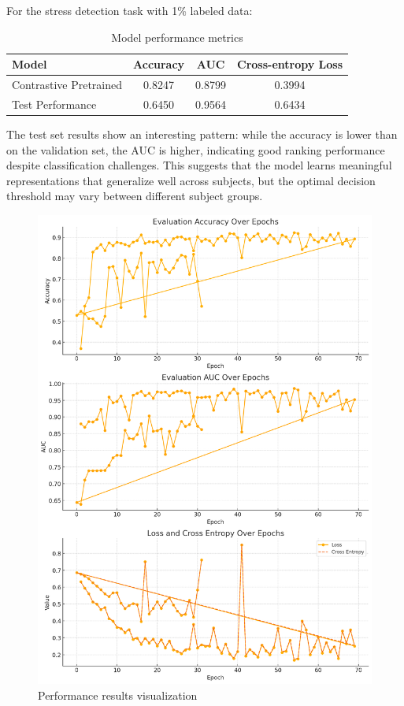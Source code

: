 \documentclass[10pt,letterpaper,twocolumn]{article}
\begin{document}
For the stress detection task with 1\% labeled data:

\begin{table}[ht]
\centering
\begin{tabular}{lccc}
\toprule
Model & Accuracy & AUC & Cross-entropy Loss \\
\midrule
Contrastive Pretrained & 0.8247 & 0.8799 & 0.3994 \\
Test Performance & 0.6450 & 0.9564 & 0.6434 \\
\bottomrule
\end{tabular}
\caption{Model performance metrics}
\label{tab:performance}
\end{table}

The test set results show an interesting pattern: while the accuracy is lower than on the validation set, the AUC is higher, indicating good ranking performance despite classification challenges. This suggests that the model learns meaningful representations that generalize well across subjects, but the optimal decision threshold may vary between different subject groups.

\begin{figure}[ht]
\centering
\includegraphics[width=0.9\columnwidth]{results.png}
\caption{Performance results visualization}
\label{fig:results}
\end{figure}
\end{document}
